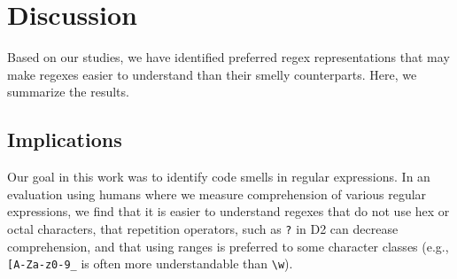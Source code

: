 \section{Discussion}
\label{sec:discussion}
Based on our studies, we have identified preferred regex representations that may make regexes easier to understand than their smelly counterparts. Here, we summarize the results.


\subsection{Implications}
Our goal in this work was to identify code smells in regular expressions. 
In an evaluation using humans where we measure comprehension of various regular expressions, we find that it is easier to understand regexes that do not use hex or octal characters, 
that repetition operators, such as \verb!?! in D2 can decrease comprehension, and that using ranges is preferred to some character classes (e.g., \verb![A-Za-z0-9_! is often more understandable than \verb!\w!). 

